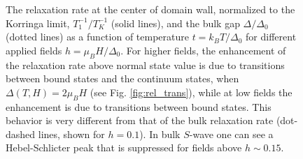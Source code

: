 \documentclass[prb,aps,showpacs,amsmath,twocolumn,10pt]{revtex4-1}
\begin{document}
\begin{figure}
\hfill
{}
\caption{
The relaxation rate at the center of domain wall, 
normalized to the Korringa limit, $T_1^{-1} / T_K^{-1}$ (solid lines), 
and the bulk gap $\Delta/\Delta_0$ (dotted lines) as a function of temperature $t = k_B T/\Delta_0$ 
for different applied fields $h = \mu_B H/\Delta_0$. 
For higher fields, the enhancement of the relaxation rate above normal state value is due to transitions between 
bound states and the continuum states, when $\Delta(T,H) = 2 \mu_B H$ (see Fig. \ref{fig:rel_trans}), 
while at low fields the enhancement is due to transitions between bound states. 
This behavior is very different from that of the bulk relaxation rate (dot-dashed lines, shown for $h=0.1$). 
In bulk $S$-wave one can see a Hebel-Schlicter peak that is suppressed for fields above $h\sim 0.15$.
}
\end{figure}
\end{document}
